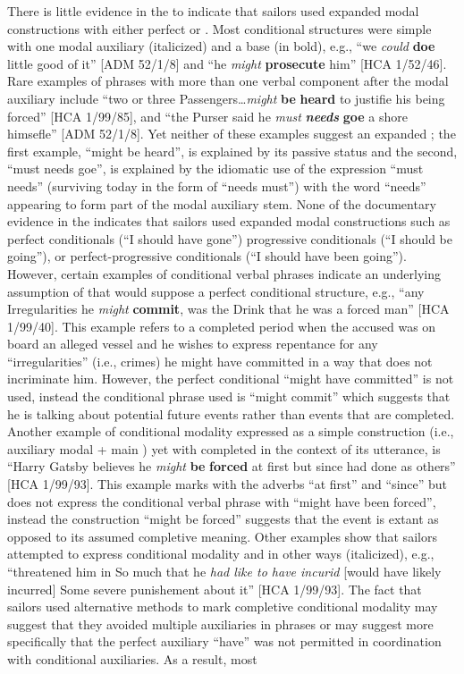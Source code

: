 There is little evidence in the  to indicate that sailors used expanded modal constructions with either perfect or . Most conditional structures were simple with one modal auxiliary (italicized) and a base  (in bold), e.g., “we \textit{could} \textbf{doe} little good of it” [ADM 52/1/8] and “he \textit{might} \textbf{prosecute} him” [HCA 1/52/46]. Rare examples of  phrases with more than one verbal component after the modal auxiliary include “two or three Passengers…\textit{might} \textbf{be} \textbf{heard} to justifie his being forced” [HCA 1/99/85], and “the Purser said he \textit{must} \textbf{\textit{needs}} \textbf{goe} a shore himsefle” [ADM 52/1/8]. Yet neither of these examples suggest an expanded ; the first example, “might be heard”, is explained by its passive status and the second, “must needs goe”, is explained by the idiomatic use of the expression “must needs” (surviving today in the form of “needs must”) with the word “needs” appearing to form part of the modal auxiliary stem. None of the documentary evidence in the  indicates that sailors used expanded modal constructions such as perfect conditionals (“I should have gone”) progressive conditionals (“I should be going”), or perfect-progressive conditionals (“I should have been going”). However, certain examples of conditional verbal phrases indicate an underlying assumption of  that would suppose a perfect conditional structure, e.g., “any Irregularities he \textit{might} \textbf{commit}, was the Drink that he was a forced man” [HCA 1/99/40]. This example refers to a completed period when the accused was on board an alleged  vessel and he wishes to express repentance for any “irregularities” (i.e., crimes) he might have committed in a way that does not incriminate him. However, the perfect conditional “might have committed” is not used, instead the conditional phrase used is “might commit” which suggests that he is talking about potential future events rather than events that are completed. Another example of conditional modality expressed as a simple construction (i.e., auxiliary modal + main ) yet with completed  in the context of its utterance, is “Harry Gatsby believes he \textit{might} \textbf{be} \textbf{forced} at first but since had done as others” [HCA 1/99/93]. This example marks  with the adverbs “at first” and “since” but does not express the conditional verbal phrase with  “might have been forced”, instead the construction “might be forced” suggests that the event is extant as opposed to its assumed completive meaning. Other examples show that sailors attempted to express conditional modality and  in other ways (italicized), e.g., “threatened him in So much that he \textit{had like to have incurid} [would have likely incurred] Some severe punishement about it” [HCA 1/99/93]. The fact that sailors used alternative methods to mark completive conditional modality may suggest that they avoided multiple auxiliaries in  phrases or may suggest more specifically that the perfect auxiliary “have” was not permitted in coordination with conditional auxiliaries. As a result, most 